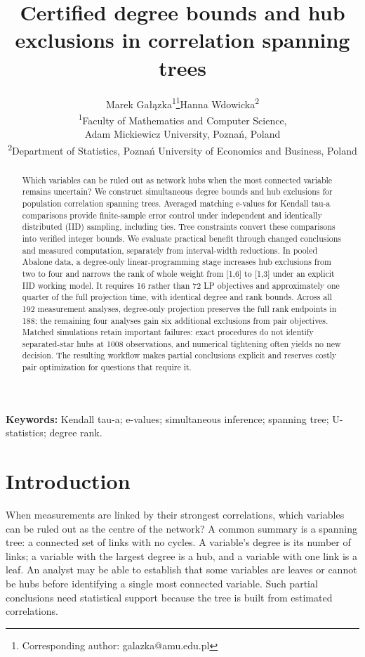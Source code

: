 \documentclass[11pt]{article}
\title{Certified degree bounds and hub exclusions in correlation spanning trees}
\author{}\hypersetup{pdfauthor={}}
\author{Marek Ga\l{}\k{a}zka\textsuperscript{1}\thanks{Corresponding author: galazka@amu.edu.pl}\quad Hanna Wdowicka\textsuperscript{2}\\[5pt]
\small\textsuperscript{1}Faculty of Mathematics and Computer Science,\\[-2pt]
\small Adam Mickiewicz University, Pozna\'n, Poland\\[3pt]
\small\textsuperscript{2}Department of Statistics, Pozna\'n University of Economics and Business, Poland}
\date{}
\theoremstyle{plain}
\theoremstyle{definition}\newtheorem{remark}{Remark}\newtheorem{example}{Example}
\begin{document}
\maketitle
\begin{abstract}
Which variables can be ruled out as network hubs when the most connected variable remains uncertain? We construct simultaneous degree bounds and hub exclusions for population correlation spanning trees. Averaged matching e-values for Kendall tau-a comparisons provide finite-sample error control under independent and identically distributed (IID) sampling, including ties. Tree constraints convert these comparisons into verified integer bounds. We evaluate practical benefit through changed conclusions and measured computation, separately from interval-width reductions. In pooled Abalone data, a degree-only linear-programming stage increases hub exclusions from two to four and narrows the rank of whole weight from [1,6] to [1,3] under an explicit IID working model. It requires 16 rather than 72 LP objectives and approximately one quarter of the full projection time, with identical degree and rank bounds. Across all 192 measurement analyses, degree-only projection preserves the full rank endpoints in 188; the remaining four analyses gain six additional exclusions from pair objectives. Matched simulations retain important failures: exact procedures do not identify separated-star hubs at 1008 observations, and numerical tightening often yields no new decision. The resulting workflow makes partial conclusions explicit and reserves costly pair optimization for questions that require it.
\end{abstract}
\noindent\textbf{Keywords:} Kendall tau-a; e-values; simultaneous inference; spanning tree; U-statistics; degree rank.

\section{Introduction}
When measurements are linked by their strongest correlations, which variables can be ruled out as the centre of the network? A common summary is a spanning tree: a connected set of links with no cycles. A variable's degree is its number of links; a variable with the largest degree is a hub, and a variable with one link is a leaf. An analyst may be able to establish that some variables are leaves or cannot be hubs before identifying a single most connected variable. Such partial conclusions need statistical support because the tree is built from estimated correlations.
\end{document}
